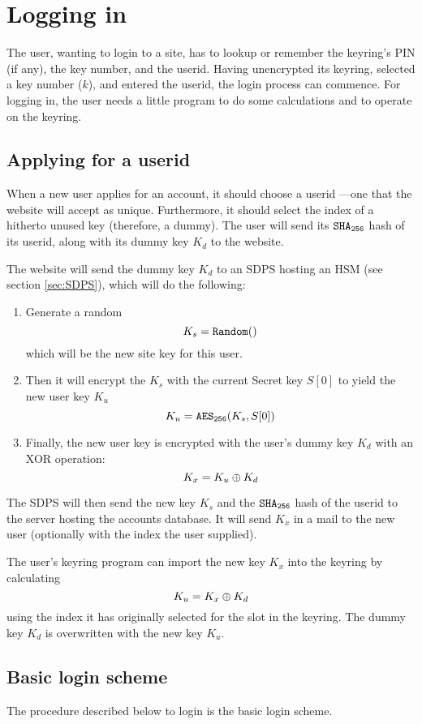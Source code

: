\section{Logging in}
The user, wanting to login to a site, has to lookup or remember the keyring's PIN (if any), the key number, and the userid.
Having unencrypted its keyring, selected a key number ($k$), and entered the userid, the login process can commence.
For logging in, the user needs a little program to do some calculations and to operate on the keyring.

\subsection{Applying for a userid}
\label{sec:applying}
When a new user applies for an account, it should choose a userid%
---one that the website will accept as unique.
Furthermore, it should select the index of a hitherto unused key
(therefore, a dummy).
The user will send its $\mathtt{SHA_{256}}$ hash of its userid,
along with its dummy key $K_d$ to the website.
\par
The website will send the dummy key $K_d$ to an SDPS hosting an HSM (see section \ref{sec:SDPS}),
which will do the following:
\begin{enumerate}
\item Generate a random
\[K_s=\texttt{Random}()\]
which will be the new site key for this user.
\item Then it will encrypt the $K_s$ with the current Secret key $S[0]$ to yield the new user key $K_u$
\[K_u=\texttt{\ensuremath{\mathtt{AES_{256}}}}(K_s, S[0])\]
\item Finally, the new user key is encrypted with the user's dummy key $K_d$
with an XOR operation:
\[K_x=K_u\oplus K_d\]
\end{enumerate}
The SDPS will then send the new key $K_s$ and the $\mathtt{SHA_{256}}$ hash of the userid to the server hosting the accounts database.
It will send $K_x$ in a mail to the new user (optionally with the index the user supplied).
\par
The user's keyring program can import the new key $K_x$ into the keyring by calculating
\[K_u=K_x\oplus K_d\]
using the index it has originally selected for the slot in the keyring.
The dummy key $K_d$ is overwritten with the new key $K_u$.


\subsection{Basic login scheme}
The procedure described below to login is the basic login scheme.

